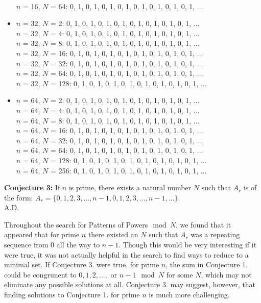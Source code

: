 \documentclass{article}
\begin{document}
\begin{flushleft}
\begin{itemize}
            \\ $n$ = 16, $N$ = 64:  0, 1, 0, 1, 0, 1, 0, 1, 0, 1, 0, 1, 0, 1, 0, 1, ...
        \item $n$ = 32, $N$ = 2:  0, 1, 0, 1, 0, 1, 0, 1, 0, 1, 0, 1, 0, 1, 0, 1, ...
            \\ $n$ = 32, $N$ = 4:  0, 1, 0, 1, 0, 1, 0, 1, 0, 1, 0, 1, 0, 1, 0, 1, ...
            \\ $n$ = 32, $N$ = 8:  0, 1, 0, 1, 0, 1, 0, 1, 0, 1, 0, 1, 0, 1, 0, 1, ...
            \\ $n$ = 32, $N$ = 16:  0, 1, 0, 1, 0, 1, 0, 1, 0, 1, 0, 1, 0, 1, 0, 1, ...
            \\ $n$ = 32, $N$ = 32:  0, 1, 0, 1, 0, 1, 0, 1, 0, 1, 0, 1, 0, 1, 0, 1, ...
            \\ $n$ = 32, $N$ = 64:  0, 1, 0, 1, 0, 1, 0, 1, 0, 1, 0, 1, 0, 1, 0, 1, ...
            \\ $n$ = 32, $N$ = 128:  0, 1, 0, 1, 0, 1, 0, 1, 0, 1, 0, 1, 0, 1, 0, 1, ...
        \item $n$ = 64, $N$ = 2:  0, 1, 0, 1, 0, 1, 0, 1, 0, 1, 0, 1, 0, 1, 0, 1, ...
            \\ $n$ = 64, $N$ = 4:  0, 1, 0, 1, 0, 1, 0, 1, 0, 1, 0, 1, 0, 1, 0, 1, ...
            \\ $n$ = 64, $N$ = 8:  0, 1, 0, 1, 0, 1, 0, 1, 0, 1, 0, 1, 0, 1, 0, 1, ...
            \\ $n$ = 64, $N$ = 16:  0, 1, 0, 1, 0, 1, 0, 1, 0, 1, 0, 1, 0, 1, 0, 1, ...
            \\ $n$ = 64, $N$ = 32:  0, 1, 0, 1, 0, 1, 0, 1, 0, 1, 0, 1, 0, 1, 0, 1, ...
            \\ $n$ = 64, $N$ = 64:  0, 1, 0, 1, 0, 1, 0, 1, 0, 1, 0, 1, 0, 1, 0, 1, ...
            \\ $n$ = 64, $N$ = 128:  0, 1, 0, 1, 0, 1, 0, 1, 0, 1, 0, 1, 0, 1, 0, 1, ...
            \\ $n$ = 64, $N$ = 256:  0, 1, 0, 1, 0, 1, 0, 1, 0, 1, 0, 1, 0, 1, 0, 1, ...
    \end{itemize}

\vspace{.1in}

{\bf Conjecture 3:} If $n$ is prime, there exists a natural number $N$ such that $A_r$ is of the form: $A_r=\{0,1,2,3,...,n-1,0,1,2,3,...,n-1,...\}$. \\
        \hspace{4.3in} A.D.

    Throughout the search for Patterns of Powers$\mod N$, we found that it appeared that for prime $n$ there existed an $N$ such that $A_r$ was a repeating sequence from $0$ all the way to $n-1$. Though this would be very interesting if it were true, it was not actually helpful in the search to find ways to reduce to a minimal set. If Conjecture 3. were true, for prime $n$, the sum in Conjecture 1. could be congrunent to $0,1,2,...,$ or $n-1\mod N$ for some $N$, which may not eliminate any possible solutions at all. Conjecture 3. may suggest, however, that finding solutions to Conjecture 1. for prime $n$ is much more challenging.


\end{flushleft}
\end{document}

